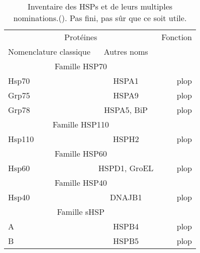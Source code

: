 \begin{table}
\begin{center}
\begin{tabular}{ l c | r }
	\multicolumn{2}{c|}{Protéines} & Fonction \\
	Nomenclature classique & Autres noms & \\
	\hline
	\hline
	\multicolumn{2}{c|}{Famille HSP70} & \\
	\hline
	Hsp70 & HSPA1 & plop \\
	Grp75 & HSPA9 & plop \\
	Grp78 & HSPA5, BiP & plop \\
	\hline
	\multicolumn{2}{c}{Famille HSP110}& \\
	\hline
	Hsp110 & HSPH2 & plop \\
	\hline
	\multicolumn{2}{c}{Famille HSP60}& \\
	\hline
	Hsp60 & HSPD1, GroEL & plop \\
	\hline
	\multicolumn{2}{c}{Famille HSP40}& \\
	\hline
	Hsp40 & DNAJB1 & plop \\
	\hline
	\multicolumn{2}{c}{Famille sHSP}& \\
	\hline
	\alpha{}A & HSPB4 & plop \\
	\alpha{}B & HSPB5 & plop \\
\end{tabular}
\caption{Inventaire des HSPs et de leurs multiples nominations.(\citet{zhang2011}). Pas fini, pas sûr que ce soit utile.}
\label{tab:tab1}
\end{center}
\end{table}
